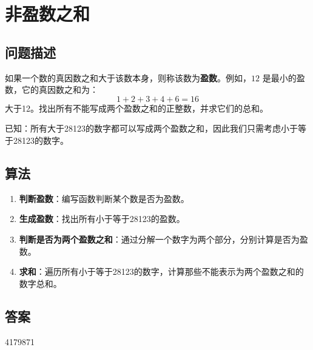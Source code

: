 \section{非盈数之和}
\subsection{问题描述}
\begin{tcolorbox}
	如果一个数的真因数之和大于该数本身，则称该数为\textbf{盈数}。例如，$12$ 是最小的盈数，它的真因数之和为：
	\[
		1 + 2 + 3 + 4 + 6 = 16
	\]
	大于12。找出所有不能写成两个盈数之和的正整数，并求它们的总和。

	已知：所有大于28123的数字都可以写成两个盈数之和，因此我们只需考虑小于等于28123的数字。

\end{tcolorbox}

\subsection{算法}
\begin{enumerate}
	\item \textbf{判断盈数}：编写函数判断某个数是否为盈数。
	\item \textbf{生成盈数}：找出所有小于等于28123的盈数。
	\item \textbf{判断是否为两个盈数之和}：通过分解一个数字为两个部分，分别计算是否为盈数。
	\item \textbf{求和}：遍历所有小于等于28123的数字，计算那些不能表示为两个盈数之和的数字总和。
\end{enumerate}

\subsection{答案}
4179871

